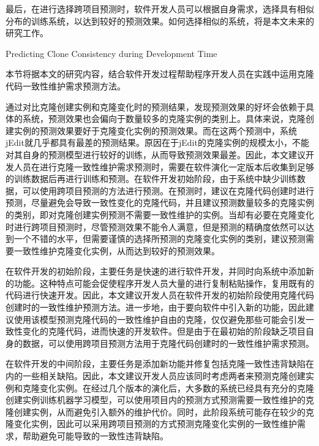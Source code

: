 最后，在进行选择跨项目预测时，软件开发人员可以根据自身需求，选择具有相似分布的训练系统，以达到较好的预测效果。如何选择相似的系统，将是本文未来的研究工作。



{Predicting Clone Consistency during Development Time}

本节将据本文的研究内容，结合软件开发过程帮助程序开发人员在实践中运用克隆代码一致性维护需求预测方法。

通过对比克隆创建实例和克隆变化时的预测结果，发现预测效果的好坏会依赖于具体的系统，预测效果也会偏向于数量较多的克隆实例的类别上。具体来说，克隆创建实例的预测效果要好于克隆变化实例的预测效果。而在这两个预测中，系统jEdit就几乎都具有最差的预测结果。原因在于jEdit的克隆实例的规模太小，不能对其自身的预测模型进行较好的训练，从而导致预测效果最差。因此，本文建议开发人员在进行克隆一致性维护需求预测时，需要在软件演化一定版本后收集到足够的训练数据后再进行训练和预测。在软件开发初始阶段，由于系统中缺少训练数据，可以使用跨项目预测的方法进行预测。在预测时，建议在克隆代码创建时进行预测，尽量避免会导致一致性变化的克隆代码，并且建议预测数量较多的克隆实例的类别，即对克隆创建实例预测不需要一致性维护的实例。当却有必要在克隆变化时进行跨项目预测时，尽管预测效果不能令人满意，但是预测的精确度依然可以达到一个不错的水平，但需要谨慎的选择所预测的克隆变化实例的类别，建议预测需要一致性维护克隆变化实例，从而达到较好的预测效果。

在软件开发的初始阶段，主要任务是快速的进行软件开发，并同时向系统中添加新的功能。这种特点可能会促使程序开发人员大量的进行复制粘贴操作，复用既有的代码进行快速开发。因此，本文建议开发人员在软件开发的初始阶段使用克隆代码创建时的一致性维护预测方法。进一步地，由于要向软件中引入新的功能，因此建议使用该模型预测克隆代码的一致性维护自由的克隆，仅仅避免那些可能会引发一致性变化的克隆代码，进而快速的开发软件。但是由于在最初始的阶段缺乏项目自身的数据，可以使用跨项目预测方法用于克隆代码创建时的一致性维护需求预测。

在软件开发的中间阶段，主要任务是添加新功能并修复包括克隆一致性违背缺陷在内的一些相关缺陷。因此，本文建议开发人员应该同时考虑两者来预测克隆创建实例和克隆变化实例。在经过几个版本的演化后，大多数的系统已经具有充分的克隆创建实例训练机器学习模型，可以使用项目内的预测方式预测需要一致性维护的克隆创建实例，从而避免引入额外的维护代价。同时，此阶段系统可能存在较少的克隆变化实例，因此可以采用跨项目预测的方式预测克隆变化实例的一致性维护需求，帮助避免可能导致的一致性违背缺陷。

